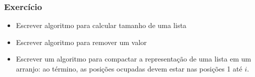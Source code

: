\documentclass{beamer}
\begin{document}
\begin{frame}

  \frametitle{Exercício}

  \begin{itemize}
    \item Escrever algoritmo para calcular tamanho de uma lista
    \item Escrever algoritmo para remover um valor
    \item Escrever um algoritmo para compactar a representação de uma lista em um
      arranjo: ao término, as posições ocupadas devem estar nas posições 1 até $i$.
  \end{itemize}
\end{frame}
\end{document}
